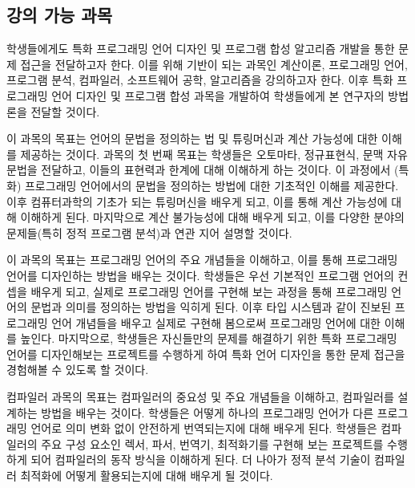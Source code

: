 \documentclass[11pt]{article}
\newcommand{\myparagraph}[1]{\medskip{\it \textbf{#1.}}}
\begin{document}
\begin{spacing}{1.145}
\section{강의 가능 과목}
\hspace{\parindent}
학생들에게도 특화 프로그래밍 언어 디자인 및 프로그램 합성 알고리즘 개발을 통한 문제 접근을 전달하고자 한다.
%
이를 위해 기반이 되는 과목인 계산이론, 프로그래밍 언어, 프로그램 분석, 컴파일러, 소프트웨어 공학, 알고리즘을 강의하고자 한다.
%
이후 특화 프로그래밍 언어 디자인 및 프로그램 합성 과목을 개발하여 학생들에게 본 연구자의 방법론을 전달할 것이다.



\myparagraph{계산이론} 
%
이 과목의 목표는 언어의 문법을 정의하는 법 및 튜링머신과 계산 가능성에 대한 이해를 제공하는 것이다. 
%
과목의 첫 번째 목표는 학생들은 오토마타, 정규표현식, 문맥 자유 문법을 전달하고, 이들의 표현력과 한계에 대해 이해하게 하는 것이다.
%
이 과정에서 (특화) 프로그래밍 언어에서의 문법을 정의하는 방법에 대한 기초적인 이해를 제공한다.
%
이후 컴퓨터과학의 기초가 되는 튜링머신을 배우게 되고, 이를 통해 계산 가능성에 대해 이해하게 된다.
%
마지막으로 계산 불가능성에 대해 배우게 되고, 이를 다양한 분야의 문제들(특히 정적 프로그램 분석)과 연관 지어 설명할 것이다.



\myparagraph{프로그래밍 언어}
%
이 과목의 목표는 프로그래밍 언어의 주요 개념들을 이해하고, 이를 통해 프로그래밍 언어를 디자인하는 방법을 배우는 것이다.
%
학생들은 우선 기본적인 프로그램 언어의 컨셉을 배우게 되고, 실제로 프로그래밍 언어를 구현해 보는 과정을 통해 프로그래밍 언어의 문법과 의미를 정의하는 방법을 익히게 된다.
%
이후 타입 시스템과 같이 진보된 프로그래밍 언어 개념들을 배우고 실제로 구현해 봄으로써 프로그래밍 언어에 대한 이해를 높인다.
%
마지막으로, 학생들은 자신들만의 문제를 해결하기 위한 특화 프로그래밍 언어를 디자인해보는 프로젝트를 수행하게 하여 특화 언어 디자인을 통한 문제 접근을 경험해볼 수 있도록 할 것이다.






\myparagraph{컴파일러}
%
컴파일러 과목의 목표는 컴파일러의 중요성 및 주요 개념들을 이해하고, 컴파일러를 설계하는 방법을 배우는 것이다.
%
학생들은 어떻게 하나의 프로그래밍 언어가 다른 프로그래밍 언어로 의미 변화 없이 안전하게 번역되는지에 대해 배우게 된다.
%
학생들은 컴파일러의 주요 구성 요소인 렉서, 파서, 번역기, 최적화기를 구현해 보는 프로젝트를 수행하게 되어 컴파일러의 동작 방식을 이해하게 된다.
%
더 나아가 정적 분석 기술이 컴파일러 최적화에 어떻게 활용되는지에 대해 배우게 될 것이다.




\end{spacing}
\end{document}

